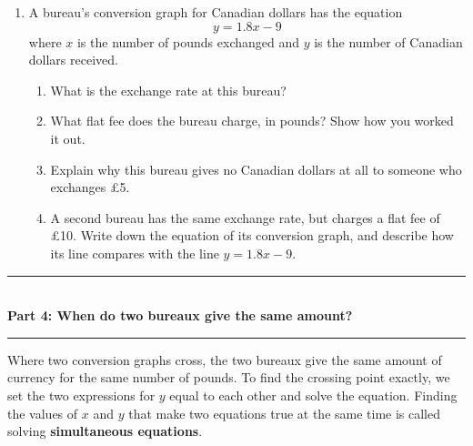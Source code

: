 \documentclass[12pt,a4paper]{article}
\newcommand{\ansline}[1][2.2cm]{\underline{\hspace{#1}}}
\newcommand{\heading}[1]{%
  \vspace{2pt}
  {\color{blue!45!black}\rule{\linewidth}{1pt}}\\[1pt]
  {\large\bfseries #1}\\[-6pt]
  {\color{blue!45!black}\rule{\linewidth}{0.4pt}}
  \vspace{2pt}}
\newcommand{\parttitle}[2]{\heading{Part #1: #2}}
\begin{document}
\begin{enumerate}[resume]
\begin{enumerate}
        Line L: \ansline[3cm] \quad Line M: \ansline[3cm] \quad
        Line N: \ansline[3cm]
  \item Lines L and M cross. Use the graph to find the number of pounds where
        they cross, and explain what the crossing point tells you about the
        airport and the high street bureaux.

        \vspace{6em}
\end{enumerate}

\newpage

\item A bureau's conversion graph for Canadian dollars has the equation
\[
  y=1.8x-9
\]
where $x$ is the number of pounds exchanged and $y$ is the number of Canadian
dollars received.
\begin{enumerate}
  \item What is the exchange rate at this bureau? \hfill \ansline[3cm]

        \vspace{2em}
  \item What flat fee does the bureau charge, in pounds? Show how you worked
        it out.

        \vspace{6em}
  \item Explain why this bureau gives no Canadian dollars at all to someone
        who exchanges \pounds5.

        \vspace{6em}
  \item A second bureau has the same exchange rate, but charges a flat fee of
        \pounds10. Write down the equation of its conversion graph, and
        describe how its line compares with the line $y=1.8x-9$.

        \vspace{8em}
\end{enumerate}

\end{enumerate}

\newpage

\parttitle{4}{When do two bureaux give the same amount?}

Where two conversion graphs cross, the two bureaux give the same amount of
currency for the same number of pounds. To find the crossing point exactly, we
set the two expressions for $y$ equal to each other and solve the equation.
Finding the values of $x$ and $y$ that make two equations true at the same time
is called solving \textbf{simultaneous equations}.
\end{document}
